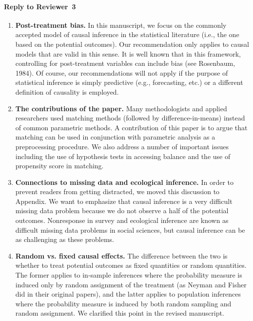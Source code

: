 \documentclass[11pt]{article}
\begin{document}

\paragraph{Reply to Reviewer~3}

\begin{enumerate}

\item {\bf Post-treatment bias.} In this manuscript, we focus on the
  commonly accepted model of causal inference in the statistical
  literature (i.e., the one based on the potential outcomes). Our
  recommendation only applies to causal models that are valid in this
  sense. It is well known that in this framework, controlling for
  post-treatment variables can include bias (see Rosenbaum, 1984).  Of
  course, our recommendations will not apply if the purpose of
  statistical inference is simply predictive (e.g., forecasting, etc.)
  or a different definition of causality is employed.

\item {\bf The contributions of the paper.} Many methodologists and
  applied researchers used matching methods (followed by
  difference-in-means) instead of common parametric methods. A
  contribution of this paper is to argue that matching can be used in
  conjunction with parametric analysis as a preprocessing procedure.
  We also address a number of important issues including the use of
  hypothesis tests in accessing balance and the use of propensity
  score in matching.

\item {\bf Connections to missing data and ecological inference.} In
  order to prevent readers from getting distracted, we moved this
  discussion to Appendix. We want to emphasize that causal inference
  is a very difficult missing data problem because we do not observe a
  half of the potential outcomes. Nonresponse in survey and ecological
  inference are known as difficult missing data problems in social
  sciences, but causal inference can be as challenging as these
  problems.

\item {\bf Random vs. fixed causal effects.} The difference between
  the two is whether to treat potential outcomes as fixed quantities
  or random quantities. The former applies to in-sample inferences where
  the probability measure is induced only by random assignment of the
  treatment (as Neyman and Fisher did in their original papers), and
  the latter applies to population inferences where the probability
  measure is induced by both random sampling and random assignment. We
  clarified this point in the revised manuscript.


\end{enumerate}
\end{document}
